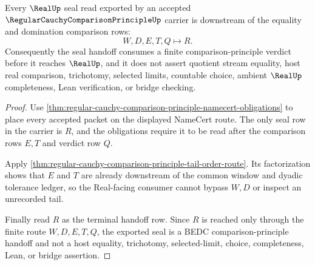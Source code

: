 \begin{theorem}
\label{thm:regular-cauchy-comparison-principle-real-seal-handoff}
Every $\RealUp$ seal read exported by an accepted $\RegularCauchyComparisonPrincipleUp$ carrier is downstream of the equality and domination comparison rows:
$$
W,D,E,T,Q\longmapsto R.
$$
Consequently the seal handoff consumes a finite comparison-principle verdict before it reaches $\RealUp$, and it does not assert quotient stream equality, host real comparison, trichotomy, selected limits, countable choice, ambient $\RealUp$ completeness, Lean verification, or bridge checking.
\end{theorem}
\begin{proof}
Use \autoref{thm:regular-cauchy-comparison-principle-namecert-obligations} to place every accepted packet on the displayed NameCert route. The only seal row in the carrier is $R$, and the obligations require it to be read after the comparison rows $E,T$ and verdict row $Q$.

Apply \autoref{thm:regular-cauchy-comparison-principle-tail-order-route}. Its factorization shows that $E$ and $T$ are already downstream of the common window and dyadic tolerance ledger, so the Real-facing consumer cannot bypass $W,D$ or inspect an unrecorded tail.

Finally read $R$ as the terminal handoff row. Since $R$ is reached only through the finite route $W,D,E,T,Q$, the exported seal is a BEDC comparison-principle handoff and not a host equality, trichotomy, selected-limit, choice, completeness, Lean, or bridge assertion.
\end{proof}



